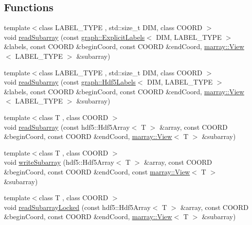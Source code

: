 \subsection*{Functions}
\begin{DoxyCompactItemize}
\item 
{\footnotesize template$<$class L\+A\+B\+E\+L\+\_\+\+T\+Y\+P\+E , std\+::size\+\_\+t D\+I\+M, class C\+O\+O\+R\+D $>$ }\\void \hyperlink{namespacenifty_1_1tools_a5d64102d01cdba610156da964f4b2581}{read\+Subarray} (const \hyperlink{classnifty_1_1graph_1_1ExplicitLabels}{graph\+::\+Explicit\+Labels}$<$ D\+I\+M, L\+A\+B\+E\+L\+\_\+\+T\+Y\+P\+E $>$ \&labels, const C\+O\+O\+R\+D \&begin\+Coord, const C\+O\+O\+R\+D \&end\+Coord, \hyperlink{classandres_1_1View}{marray\+::\+View}$<$ L\+A\+B\+E\+L\+\_\+\+T\+Y\+P\+E $>$ \&subarray)
\item 
{\footnotesize template$<$class L\+A\+B\+E\+L\+\_\+\+T\+Y\+P\+E , std\+::size\+\_\+t D\+I\+M, class C\+O\+O\+R\+D $>$ }\\void \hyperlink{namespacenifty_1_1tools_a32fca5240a87f007e50dac403671cfa0}{read\+Subarray} (const \hyperlink{classnifty_1_1graph_1_1Hdf5Labels}{graph\+::\+Hdf5\+Labels}$<$ D\+I\+M, L\+A\+B\+E\+L\+\_\+\+T\+Y\+P\+E $>$ \&labels, const C\+O\+O\+R\+D \&begin\+Coord, const C\+O\+O\+R\+D \&end\+Coord, \hyperlink{classandres_1_1View}{marray\+::\+View}$<$ L\+A\+B\+E\+L\+\_\+\+T\+Y\+P\+E $>$ \&subarray)
\item 
{\footnotesize template$<$class T , class C\+O\+O\+R\+D $>$ }\\void \hyperlink{namespacenifty_1_1tools_a8b0e46da1e0ed94de12c1ea0b89a07d9}{read\+Subarray} (const hdf5\+::\+Hdf5\+Array$<$ T $>$ \&array, const C\+O\+O\+R\+D \&begin\+Coord, const C\+O\+O\+R\+D \&end\+Coord, \hyperlink{classandres_1_1View}{marray\+::\+View}$<$ T $>$ \&subarray)
\item 
{\footnotesize template$<$class T , class C\+O\+O\+R\+D $>$ }\\void \hyperlink{namespacenifty_1_1tools_a46fa9e03448a433ba5ca485435b540b8}{write\+Subarray} (hdf5\+::\+Hdf5\+Array$<$ T $>$ \&array, const C\+O\+O\+R\+D \&begin\+Coord, const C\+O\+O\+R\+D \&end\+Coord, const \hyperlink{classandres_1_1View}{marray\+::\+View}$<$ T $>$ \&subarray)
\item 
{\footnotesize template$<$class T , class C\+O\+O\+R\+D $>$ }\\void \hyperlink{namespacenifty_1_1tools_a562317b7926e706fa893b03ad3bfdfda}{read\+Subarray\+Locked} (const hdf5\+::\+Hdf5\+Array$<$ T $>$ \&array, const C\+O\+O\+R\+D \&begin\+Coord, const C\+O\+O\+R\+D \&end\+Coord, \hyperlink{classandres_1_1View}{marray\+::\+View}$<$ T $>$ \&subarray)

\end{DoxyCompactItemize}
